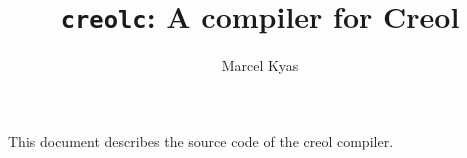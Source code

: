 \documentclass[a4paper,10pt,DIV10,draft]{scrartcl}
\title{\texttt{creolc}: A compiler for Creol}
\author{Marcel Kyas}
\begin{document}
\maketitle

This document describes the source code of the creol compiler.


\end{document}
